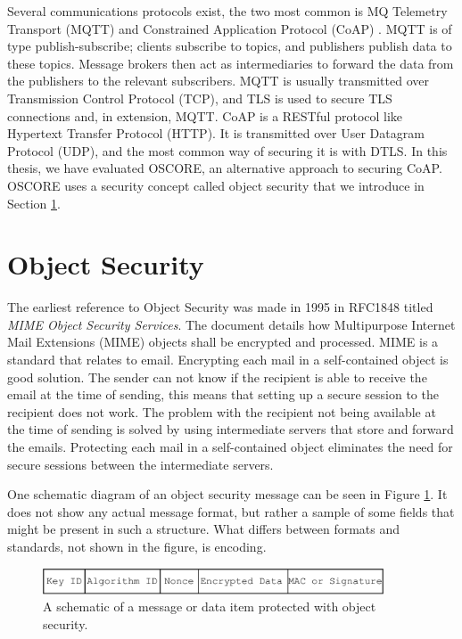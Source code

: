 Several communications protocols exist, the two most common is MQ Telemetry Transport (MQTT) \cite{hunkeler2008mqtt} and Constrained Application Protocol (CoAP) \cite{rfc7252}. MQTT is of type publish-subscribe; clients subscribe to topics, and publishers publish data to these topics. Message brokers then act as intermediaries to forward the data from the publishers to the relevant subscribers.
MQTT is usually transmitted over Transmission Control Protocol (TCP), and TLS is used to secure TLS connections and, in extension, MQTT.
CoAP is a RESTful protocol like Hypertext Transfer Protocol (HTTP). It is transmitted over User Datagram Protocol (UDP), and the most common way of securing it is with DTLS. In this thesis, we have evaluated OSCORE, an alternative approach to securing CoAP. OSCORE uses a security concept called object security that we introduce in Section \ref{sec:object_security}.

\section{Object Security}
\label{sec:object_security}
The earliest reference to Object Security was made in 1995 in RFC1848 \cite{RFC1848} titled \textit{MIME Object Security Services}. The document details how Multipurpose Internet Mail Extensions (MIME) objects shall be encrypted and processed. MIME is a standard that relates to email. Encrypting each mail in a self-contained object is good solution. The sender can not know if the recipient is able to receive the email at the time of sending, this means that setting up a secure session to the recipient does not work. The problem with the recipient not being available at the time of sending is solved by using intermediate servers that store and forward the emails. Protecting each mail in a self-contained object eliminates the need for secure sessions between the intermediate servers.

One schematic diagram of an object security message can be seen in Figure \ref{fig:object-security}. It does not show any actual message format, but rather a sample of some fields that might be present in such a structure. What differs between formats and standards, not shown in the figure, is encoding. 

\begin{figure}[h]
\centering
\includegraphics[width=0.9\textwidth]{images/object_security.pdf}
\caption{A schematic of a message or data item protected with object security.}
\label{fig:object-security}
\end{figure}


